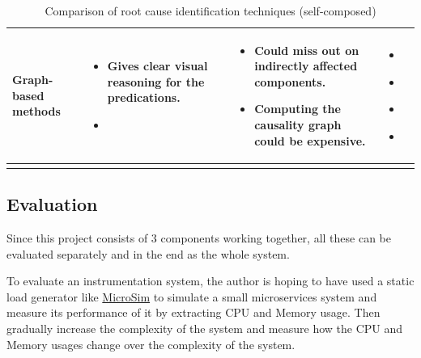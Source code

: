 \begin{longtable}{| p{23mm} | p{42mm} | p{42mm} | p{42mm} |}
    Graph-based methods &
    \vspace{-8mm}
    \begin{itemize}[leftmargin=0mm,noitemsep,nolistsep,label={}] 
        \item Gives clear visual reasoning for the predications.
        \item  
        \vspace{-7mm}
    \end{itemize} &
    \vspace{-8mm}
    \begin{itemize}[leftmargin=0mm,noitemsep,nolistsep,label={}] 
        \item Could miss out on indirectly affected components.
        \item Computing the causality graph could be expensive.
        \vspace{-7mm}
    \end{itemize} &
    \vspace{-8mm}
    \begin{itemize}[leftmargin=0mm,noitemsep,nolistsep,label={}] 
        \item \cite{samir2019dla}
        \item \cite{wu2020microrca}
        \item \cite{ma2020automap}
        \item \cite{meng2020localizing}
        \vspace{-7mm}
    \end{itemize} \\ \hline

    \caption{Comparison of root cause identification techniques (self-composed)}
\end{longtable}

\subsection{Evaluation}

Since this project consists of 3 components working together, all these can be evaluated separately and in the end as the whole system.

To evaluate an instrumentation system, the author is hoping to have used a static load generator like \href{https://github.com/MrSupiri/MicroSim}{MicroSim} to simulate a small microservices system and measure its performance of it by extracting CPU and Memory usage. Then gradually increase the complexity of the system and measure how the CPU and Memory usages change over the complexity of the system.


